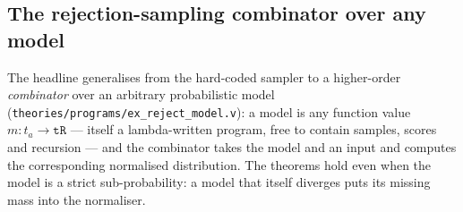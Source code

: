 \subsection{The rejection-sampling combinator over any model}%
\label{ssec:cbv-reject-model}

The headline generalises from the hard-coded sampler to a
higher-order \emph{combinator} over an arbitrary probabilistic model
(\texttt{theories/programs/ex\_reject\_model.v}): a model is any
function value $m : t_a \to \mathtt{tR}$ --- itself a lambda-written
program, free to contain samples, scores and recursion --- and the
combinator takes the model and an input and computes the
corresponding normalised distribution. The theorems hold even when the
model is a strict sub-probability: a model that itself diverges puts
its missing mass into the normaliser.

